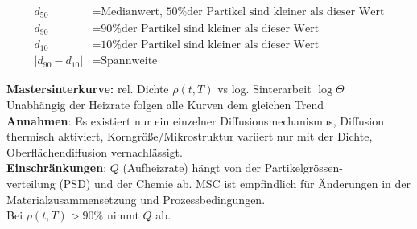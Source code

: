 \begin{tiny}
    \begin{align*}
    d_{50} &= \text{Medianwert, 50\% der Partikel sind kleiner als dieser Wert} \\
    d_{90} &= \text{90\% der Partikel sind kleiner als dieser Wert} \\
    d_{10} &= \text{10\% der Partikel sind kleiner als dieser Wert} \\
    | d_{90} - d_{10} | &= \text{Spannweite}
\end{align*}
\end{tiny}


\textbf{Mastersinterkurve:}
rel. Dichte $\rho (t,T)$  vs log. Sinterarbeit $\log \Theta $\\
Unabhängig der Heizrate folgen alle Kurven dem gleichen Trend\\

\textbf{Annahmen}: Es existiert nur ein einzelner Diffusionsmechanismus, 
Diffusion thermisch aktiviert, Korngröße/Mikrostruktur variiert 
nur mit der Dichte, Oberflächendiffusion vernachlässigt.\\

\textbf{Einschränkungen}: $Q$ (Aufheizrate) hängt von der Partikelgrössen-\\
verteilung (PSD) und der Chemie ab. MSC ist empfindlich für 
Änderungen in der Materialzusammensetzung und Prozessbedingungen.\\
Bei $\rho (t,T) > 90 \%$ nimmt $Q$ ab.\\